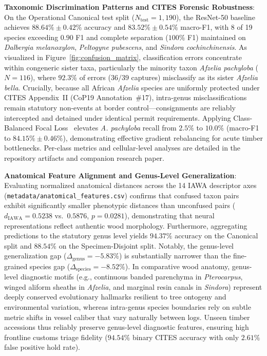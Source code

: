 \documentclass[a4paper,fleqn,12pt]{cas-sc}
\begin{document}
\noindent
\textbf{Taxonomic Discrimination Patterns and CITES Forensic Robustness}:
On the Operational Canonical test split ($N_{\text{test}} = 1{,}190$), the ResNet-50 baseline achieves $88.64\% \pm 0.42\%$ accuracy and $83.52\% \pm 0.54\%$ macro-F1, with 8 of 19 species exceeding $0.90$ F1 and complete separation ($100\%$ F1) maintained on \textit{Dalbergia melanoxylon}, \textit{Peltogyne pubescens}, and \textit{Sindora cochinchinensis}. As visualized in Figure~\ref{fig:confusion_matrix}, classification errors concentrate within congeneric sister taxa, particularly the minority taxon \textit{Afzelia pachyloba} ($N=116$), where $92.3\%$ of errors ($36 / 39$ captures) misclassify as its sister \textit{Afzelia bella}. Crucially, because all African \textit{Afzelia} species are uniformly protected under CITES Appendix~II (CoP19 Annotation~\#17), intra-genus misclassifications remain statutory non-events at border control---consignments are reliably intercepted and detained under identical permit requirements. Applying Class-Balanced Focal Loss~\cite{cui2019} elevates \textit{A. pachyloba} recall from $2.5\%$ to $10.0\%$ (macro-F1 to $84.15\% \pm 0.46\%$), demonstrating effective gradient rebalancing for acute timber bottlenecks. Per-class metrics and cellular-level analyses are detailed in the repository artifacts and companion research paper.

\noindent
\textbf{Anatomical Feature Alignment and Genus-Level Generalization}:
Evaluating normalized anatomical distances across the 14 IAWA descriptor axes (\texttt{metadata/anatomical\_features.csv}) confirms that confused taxon pairs exhibit significantly smaller phenotypic distances than unconfused pairs ($d_{\text{IAWA}} = 0.5238$ vs.\ $0.5876$, $p = 0.0281$), demonstrating that neural representations reflect authentic wood morphology. Furthermore, aggregating predictions to the statutory genus level yields $94.37\%$ accuracy on the Canonical split and $88.54\%$ on the Specimen-Disjoint split. Notably, the genus-level generalization gap ($\Delta_{\text{genus}} = -5.83\%$) is substantially narrower than the fine-grained species gap ($\Delta_{\text{species}} = -8.52\%$). In comparative wood anatomy, genus-level diagnostic motifs (e.g., continuous banded parenchyma in \textit{Pterocarpus}, winged aliform sheaths in \textit{Afzelia}, and marginal resin canals in \textit{Sindora}) represent deeply conserved evolutionary hallmarks resilient to tree ontogeny and environmental variation, whereas intra-genus species boundaries rely on subtle metric shifts in vessel caliber that vary naturally between logs. Unseen timber accessions thus reliably preserve genus-level diagnostic features, ensuring high frontline customs triage fidelity ($94.54\%$ binary CITES accuracy with only $2.61\%$ false positive hold rate).
\end{document}
